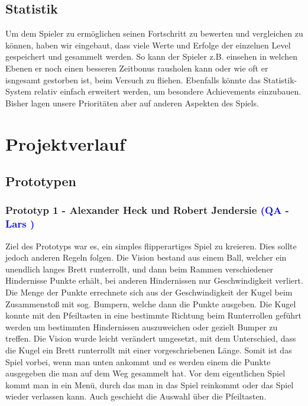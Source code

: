 \documentclass[12pt]{article}
\begin{document}
\subsection{Statistik}
Um dem Spieler zu ermöglichen seinen Fortschritt zu bewerten und vergleichen zu können, haben wir eingebaut, dass viele Werte und Erfolge der einzelnen Level gespeichert und gesammelt werden. So kann der Spieler z.B. einsehen in welchen Ebenen er noch einen besseren Zeitbonus rausholen kann oder wie oft er isngesamt gestorben ist, beim Versuch zu fliehen. \newline
Ebenfalls könnte das Statistik-System relativ einfach erweitert werden, um besondere Achievements einzubauen. Bisher lagen unsere Prioritäten aber auf anderen Aspekten des Spiels.

\newpage
\section{Projektverlauf}

\vspace{2cm}
\subsection{Prototypen}

\vspace{1cm}
\subsubsection{Prototyp 1 - Alexander Heck und Robert Jendersie \textcolor{blue}{(QA - Lars )}}

Ziel des Prototyps war es, ein simples flipperartiges Spiel zu kreieren. Dies sollte jedoch anderen Regeln folgen. Die Vision
bestand aus einem Ball, welcher ein unendlich langes Brett runterrollt, und dann beim Rammen verschiedener Hindernisse
Punkte erhält, bei anderen Hindernissen nur Geschwindigkeit verliert. Die Menge der Punkte errechnete sich aus der Geschwindigkeit
der Kugel beim Zusammenstoß mit sog. Bumpern, welche dann die Punkte ausgeben. Die Kugel konnte mit den Pfeiltasten
in eine bestimmte Richtung beim Runterrollen geführt werden um bestimmten Hindernissen auszuweichen oder gezielt Bumper
zu treffen. Die Vision wurde leicht verändert umgesetzt, mit dem Unterschied, dass die Kugel ein Brett runterrollt mit einer
vorgeschriebenen Länge. Somit ist das Spiel vorbei, wenn man unten ankommt und es werden einem die Punkte ausgegeben
die man auf dem Weg gesammelt hat. Vor dem eigentlichen Spiel kommt man in ein Menü, durch das man in das Spiel
reinkommt oder das Spiel wieder verlassen kann. Auch geschieht die Auswahl über die Pfeiltasten.\newline\newline
\end{document}
